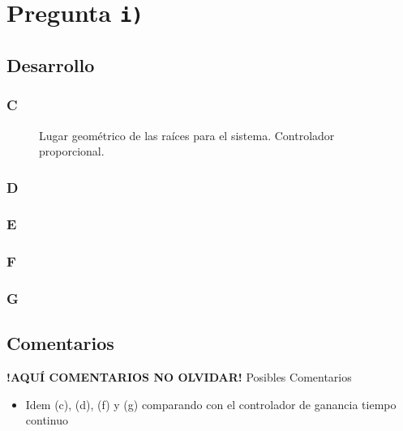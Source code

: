 \section{Pregunta \texttt{i)}}\label{pregunta-i}
\subsection{Desarrollo}

\subsubsection{C} %

\begin{figure}[ht]
  \centering
  
  \caption{Lugar geométrico de las raíces para el sistema. Controlador proporcional.}
  \label{fig:lgr-i}
\end{figure}

\FloatBarrier
\subsubsection{D}%

\FloatBarrier
\subsubsection{E}%

\FloatBarrier
\subsubsection{F}%

\FloatBarrier
\subsubsection{G}%

\FloatBarrier
\subsection{Comentarios}


\textbf{!AQUÍ COMENTARIOS NO OLVIDAR!}
Posibles Comentarios
\begin{itemize}
    \item Idem (c), (d), (f) y (g) comparando con el controlador de ganancia tiempo continuo
\end{itemize}
